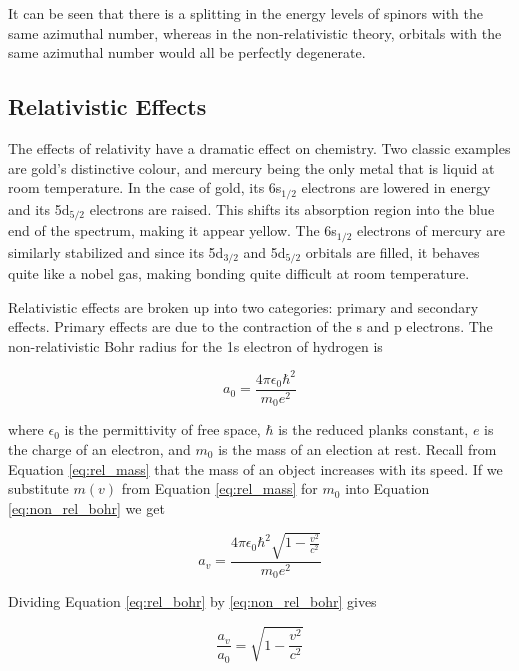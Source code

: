 \documentclass[12pt]{report}
\begin{document}
It can be seen that there is a splitting in the energy levels of spinors with the same azimuthal number, whereas in the non-relativistic theory, orbitals with the same azimuthal number would all be perfectly degenerate.

\subsection{Relativistic Effects}
The effects of relativity have a dramatic effect on chemistry. Two classic examples are gold's distinctive colour, and mercury being the only metal that is liquid at room temperature. In the case of gold, its 6s$_{1/2}$ electrons are lowered in energy and its 5d$_{5/2}$ electrons are raised. This shifts its absorption region into the blue end of the spectrum, making it appear yellow\cite{Bartlett1998}. The 6s$_{1/2}$ electrons of mercury are similarly stabilized and since its 5d$_{3/2}$ and 5d$_{5/2}$ orbitals are filled, it behaves quite like a nobel gas, making bonding quite difficult at room temperature\cite{Norrby1991}.

Relativistic effects are broken up into two categories: primary and secondary effects. Primary effects are due to the contraction of the s and p electrons. The non-relativistic Bohr radius for the 1s electron of hydrogen is\cite{Griffiths2} 

\begin{equation}
\label{eq:non_rel_bohr}
a_{0} = \frac{4\pi{}\epsilon_{0}\hbar^{2}}{m_{0}e^{2}}
\end{equation}

where $\epsilon_{0}$ is the permittivity of free space, $\hbar$ is the reduced planks constant, $e$ is the charge of an electron, and $m_{0}$ is the mass of an election at rest. Recall from Equation \ref{eq:rel_mass} that the mass of an object increases with its speed. If we substitute $m(v)$ from Equation \ref{eq:rel_mass} for $m_{0}$ into Equation \ref{eq:non_rel_bohr} we get

\begin{equation}
\label{eq:rel_bohr}
a_{v} = \frac{4\pi{}\epsilon_{0}\hbar^{2}\sqrt{1 - \frac{v^2}{c^2}}}{m_{0}e^{2}}
\end{equation}

Dividing Equation \ref{eq:rel_bohr} by \ref{eq:non_rel_bohr} gives 

\begin{equation}
\label{eq:bohr_frac}
\frac{a_{v}}{a_{0}} = \sqrt{1 - \frac{v^2}{c^2}}
\end{equation}
\end{document}
